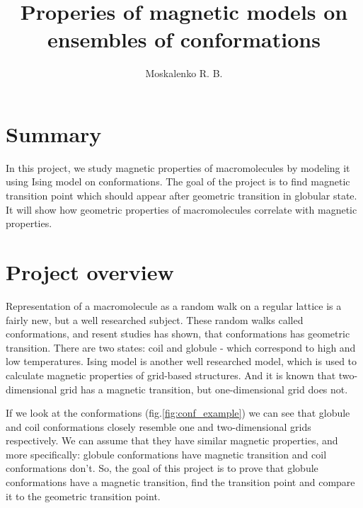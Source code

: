 \documentclass[a4paper,12pt]{article}
\title{Properies of magnetic models on ensembles of conformations}
\author{Moskalenko R. B.}
\begin{document}


\section*{Summary}
In this project, we study magnetic properties of macromolecules by modeling it using Ising model on conformations. The goal of the project is to find magnetic transition point which should appear after geometric transition in globular state. It will show how geometric properties of macromolecules correlate with magnetic properties.

\section*{Project overview}
Representation of a macromolecule as a random walk on a regular lattice is a fairly new, but a well researched subject. These random walks called conformations, and resent studies has shown, that conformations has geometric transition. There are two states: coil and globule - which correspond to high and low temperatures. Ising model\cite{Ising_model} is another well researched model, which is used to calculate magnetic properties of grid-based structures. And it is known that two-dimensional grid has a magnetic transition, but one-dimensional grid does not.

If we look at the conformations (fig.\ref{fig:conf_example}) we can see that globule and coil conformations closely resemble one and two-dimensional grids respectively. We can assume that they have similar magnetic properties, and more specifically: globule conformations have magnetic transition and coil conformations don't. So, the goal of this project is to prove that globule conformations have a magnetic transition, find the transition point and compare it to the geometric transition point.
\end{document}
